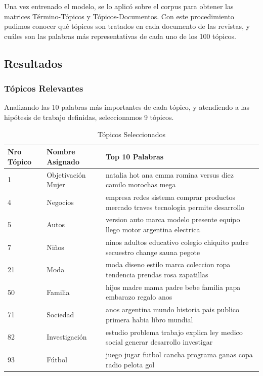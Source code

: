 \documentclass[a4paper]{article}
\begin{document}
Una vez entrenado el modelo, se lo aplic\'o sobre el corpus para obtener las matrices T\'ermino-T\'opicos y T\'opicos-Documentos.
Con este procedimiento pudimos  conocer qu\'e t\'opicos son tratados en cada documento de las revistas, y cu\'ales son las palabras m\'as representativas de cada uno de los 100 t\'opicos.

\subsection{Resultados}
	\subsubsection{T\'opicos Relevantes}
    Analizando las 10 palabras m\'as importantes de cada t\'opico, y atendiendo a las hip\'otesis de trabajo definidas, seleccionamos 9 t\'opicos.
    
    \begin{table}[!htbp]
	\centering
	\begin{tabular}{|p{1cm}|p{2cm}|p{10cm}|}
\hline
Nro T\'opico & Nombre Asignado & Top 10 Palabras\\
\hline
1 & Objetivaci\'on Mujer & natalia hot ana emma romina versus diez camilo morochas mega\\
4 & Negocios & empresa redes sistema comprar productos mercado traves tecnologia permite desarrollo\\
5 & Autos & version auto marca modelo presente equipo llego motor argentina electrica\\
7 & Ni\~nos & ninos adultos educativo colegio chiquito padre secuestro change sauna pegote\\
21 & Moda & moda diseno estilo marca coleccion ropa tendencia prendas rosa zapatillas\\
50 & Familia & hijos madre mama padre bebe familia papa embarazo regalo anos\\
71 & Sociedad & anos argentina mundo historia pais publico primera habia libro mundial\\
82 & Investigaci\'on & estudio problema trabajo explica ley medico social generar desarrollo investigar\\
93 & F\'utbol & juego jugar futbol cancha programa ganas copa radio pelota gol\\
\hline


\end{tabular}
\caption{\label{tab:widgets}T\'opicos Seleccionados}
\end{table}
\end{document}
